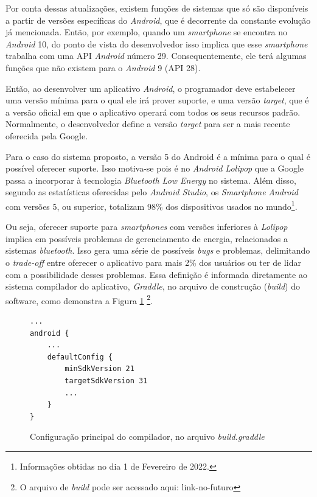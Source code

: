Por conta dessas atualizações, existem funções de sistemas que só são disponíveis a partir de versões específicas do \textit{Android}, que é decorrente da constante evolução já mencionada. Então, por exemplo, quando um \textit{smartphone} se encontra no \textit{Android} 10, do ponto de vista do desenvolvedor isso implica que esse \textit{smartphone} trabalha com uma API \textit{Android} número 29. Consequentemente, ele terá algumas funções que não existem para o \textit{Android} 9 (API 28).

Então, ao desenvolver um aplicativo \textit{Android}, o programador deve estabelecer uma versão mínima para o qual ele irá prover suporte, e uma versão \textit{target}, que é a versão oficial em que o aplicativo operará com todos os seus recursos padrão. Normalmente, o desenvolvedor define a versão \textit{target} para ser a mais recente oferecida pela Google.

Para o caso do sistema proposto, a versão 5 do Android é a mínima para o qual é possível oferecer suporte. Isso motiva-se pois é no \textit{Android Lolipop} que a Google passa a incorporar à tecnologia \textit{Bluetooth Low Energy} no sistema. Além disso, segundo as estatísticas oferecidas pelo \textit{Android Studio}, os \textit{Smartphone} \textit{Android} com versões 5, ou superior, totalizam 98\% dos dispositivos usados no mundo\footnote{Informações obtidas no dia 1 de Fevereiro de 2022.}. 

Ou seja, oferecer suporte para \textit{smartphones} com versões inferiores à \textit{Lolipop} implica em possíveis problemas de gerenciamento de energia, relacionados a sistemas \textit{bluetooth}. Isso gera uma série de possíveis \textit{bugs} e problemas, delimitando o \textit{trade-off} entre oferecer o aplicativo para mais 2\% dos usuários ou ter de lidar com a possibilidade desses problemas. Essa definição é informada diretamente ao sistema compilador do aplicativo, \textit{Graddle}, no arquivo de construção (\textit{build}) do software, como demonstra a Figura \ref{code:compilation}  \footnote{O arquivo de \textit{build} pode ser acessado aqui: link-no-futuro}.

\begin{figure}[htb]
	\centering
	\caption{Configuração principal do compilador, no arquivo \textit{build.graddle}}
	\vspace{-15pt}
	\begin{verbatim}
...
android {
	...
	defaultConfig {
		minSdkVersion 21
		targetSdkVersion 31
		...
	}
}
\end{verbatim}
\label{code:compilation}
\vspace{-30pt}
\end{figure}

